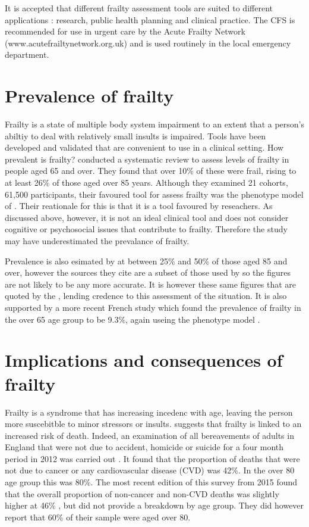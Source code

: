 \documentclass
[
	12pt,
	a4paper,
	oneside,
]{report}
\begin{document}
It is accepted that different frailty assessment tools are suited to different
applications \parencite{ensrud:08,martin:08,romero-ortuno:16}: research, public
health planning and clinical practice. The CFS is recommended for use in urgent
care by the Acute Frailty Network (www.acutefrailtynetwork.org.uk) and is
used routinely in the local emergency department.

\section{Prevalence of frailty}
\label{sec:litrevprev}

Frailty is a state of multiple body system impairment to an extent that a
person's abiltiy to deal with relatively small insults is impaired. Tools have 
been developed and validated that are convenient to use in a clinical setting.
How prevalent is frailty? \textcite{collard:12} conducted a systematic review 
to assess levels of frailty in people aged 65 and over. They found that over
10\% of these were frail, rising to at least 26\% of those aged over 85 years.
Although they examined 21 cohorts, 61,500 participants, their favoured tool for 
assess frailty was the phenotype model of \textcite{fried:01}. Their reationale
for this is that it is a tool favoured by reseachers. As discussed 
above, however, it is not an ideal clinical tool and does not consider cognitive or
psychosocial issues that contribute to frailty. Therefore the study may have 
underestimated the prevalance of frailty.

Prevalence is also esimated by \textcite{clegg:13} at between 25\% and 50\% of
those aged 85 and over, however the sources they cite are a subset of those
used by \textcite{collard:12} so the figures are not likely to be any more
accurate. It is however these same figures that are quoted by the
\textcite{bgs:14}, lending credence to this assessment of the situation. It
is also supported by a more recent French study which found the prevalence of
frailty in the over 65 age group to be 9.3\%, again useing the phenotype model
\parencite{cossec:16}.

\section{Implications and consequences of frailty}

Frailty is a syndrome that has increasing incedenc with age, leaving the person
more suscebitble to minor stressors or insults. \textcite{collard:12} suggests
that frailty is linked to an increased risk of death. Indeed,
an examination
of all bereavements of adults in England that were not due to accident, homicide or suicide for 
a four month period in 2012 was 
carried out \parencite{ons:13}. It found that the proportion of deaths
that were not due to cancer or any cardiovascular disease (CVD) was 42\%. 
In the over 80
age group this was 80\%. The most recent edition of this survey from 2015 found
that the overall proportion of non-cancer and non-CVD deaths was slightly higher 
at 46\% \parencite{ons:16}, but did not provide a breakdown by age group. They 
did however report that 60\% of their sample were aged over 80.
\end{document}
